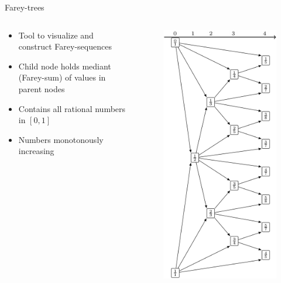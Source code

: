 \begin{frame}{Farey-trees}
	\begin{columns}
		\begin{column}{.5 \textwidth}
			\begin{itemize}
				\item Tool to visualize and construct Farey-sequences
				\item Child node holds mediant (Farey-sum) of values in parent nodes
				      \pause
				      \vspace{2em}
				\item Contains all rational numbers in $[0, 1]$
				\item Numbers monotonously increasing
			\end{itemize}
		\end{column}
		\begin{column}{.5 \textwidth}
			\vspace{-5em}
			\begin{figure}
				\includegraphics[width=.47 \textwidth]{../../Report/Figures/FareyTrees/LR_RotNum/adding.png}
			\end{figure}
		\end{column}
	\end{columns}
\end{frame}


